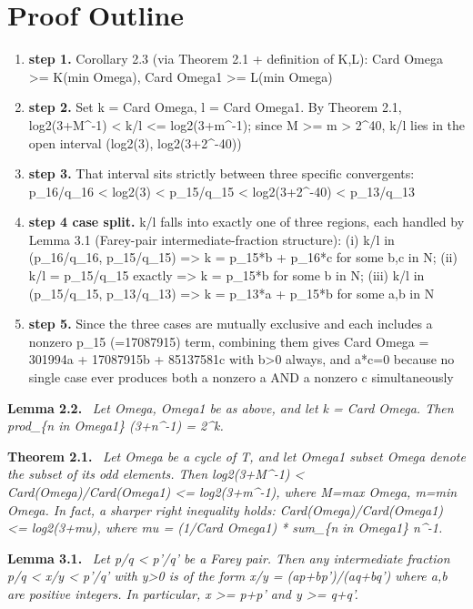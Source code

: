 \documentclass[11pt]{article}
\newenvironment{sourceresult}[1]{\par\medskip\noindent\textbf{#1.}\ \itshape}{\par\medskip}
\begin{document}
\section{Proof Outline}
\begin{enumerate}
\item \textbf{step 1.} Corollary 2.3 (via Theorem 2.1 + definition of K,L): Card Omega >= K(min Omega), Card Omega1 >= L(min Omega)
\item \textbf{step 2.} Set k = Card Omega, l = Card Omega1. By Theorem 2.1, log2(3+M\textasciicircum{}-1) < k/l <= log2(3+m\textasciicircum{}-1); since M >= m > 2\textasciicircum{}40, k/l lies in the open interval (log2(3), log2(3+2\textasciicircum{}-40))
\item \textbf{step 3.} That interval sits strictly between three specific convergents: p\_16/q\_16 < log2(3) < p\_15/q\_15 < log2(3+2\textasciicircum{}-40) < p\_13/q\_13
\item \textbf{step 4 case split.} k/l falls into exactly one of three regions, each handled by Lemma 3.1 (Farey-pair intermediate-fraction structure): (i) k/l in (p\_16/q\_16, p\_15/q\_15) => k = p\_15*b + p\_16*c for some b,c in N; (ii) k/l = p\_15/q\_15 exactly => k = p\_15*b for some b in N; (iii) k/l in (p\_15/q\_15, p\_13/q\_13) => k = p\_13*a + p\_15*b for some a,b in N
\item \textbf{step 5.} Since the three cases are mutually exclusive and each includes a nonzero p\_15 (=17087915) term, combining them gives Card Omega = 301994a + 17087915b + 85137581c with b>0 always, and a*c=0 because no single case ever produces both a nonzero a AND a nonzero c simultaneously
\end{enumerate}
\begin{sourceresult}{Lemma 2.2}
Let Omega, Omega1 be as above, and let k = Card Omega. Then prod\_\{n in Omega1\} (3+n\textasciicircum{}-1) = 2\textasciicircum{}k.
\end{sourceresult}
\begin{sourceresult}{Theorem 2.1}
Let Omega be a cycle of T, and let Omega1 subset Omega denote the subset of its odd elements. Then log2(3+M\textasciicircum{}-1) < Card(Omega)/Card(Omega1) <= log2(3+m\textasciicircum{}-1), where M=max Omega, m=min Omega. In fact, a sharper right inequality holds: Card(Omega)/Card(Omega1) <= log2(3+mu), where mu = (1/Card Omega1) * sum\_\{n in Omega1\} n\textasciicircum{}-1.
\end{sourceresult}
\begin{sourceresult}{Lemma 3.1}
Let p/q < p'/q' be a Farey pair. Then any intermediate fraction p/q < x/y < p'/q' with y>0 is of the form x/y = (ap+bp')/(aq+bq') where a,b are positive integers. In particular, x >= p+p' and y >= q+q'.
\end{sourceresult}
\end{document}
